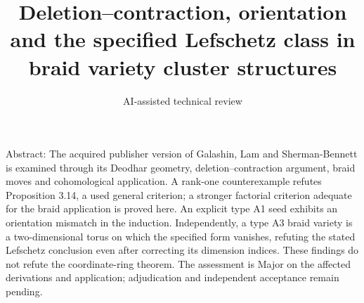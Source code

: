 \documentclass[10pt]{article}
\title{Deletion–contraction, orientation and the specified Lefschetz class in braid variety cluster structures}
\author{AI-assisted technical review}
\date{}
\begin{document}
\maketitle
Abstract: The acquired publisher version of Galashin, Lam and Sherman-Bennett is examined through its Deodhar geometry, deletion–contraction argument, braid moves and cohomological application. A rank-one counterexample refutes Proposition 3.14, a used general criterion; a stronger factorial criterion adequate for the braid application is proved here. An explicit type A1 seed exhibits an orientation mismatch in the induction. Independently, a type A3 braid variety is a two-dimensional torus on which the specified form vanishes, refuting the stated Lefschetz conclusion even after correcting its dimension indices. These findings do not refute the coordinate-ring theorem. The assessment is Major on the affected derivations and application; adjudication and independent acceptance remain pending.\par
\end{document}
